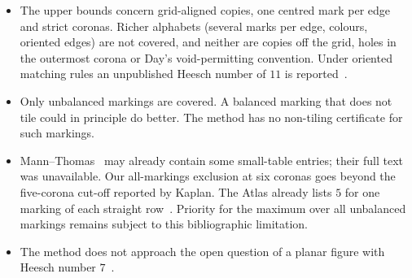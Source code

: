 \documentclass[11pt]{amsart}
\theoremstyle{definition}
\theoremstyle{remark}
\begin{document}
\begin{itemize}
\item The upper bounds concern grid-aligned copies, one centred mark per edge and strict coronas. Richer alphabets (several marks per edge, colours, oriented edges) are not covered, and neither are copies off the grid, holes in the outermost corona or Day's void-permitting convention. Under oriented matching rules an unpublished Heesch number of $11$ is reported~\cite{BDS2023}.
\item Only unbalanced markings are covered. A balanced marking that does not tile could in principle do better. The method has no non-tiling certificate for such markings.
\item Mann--Thomas~\cite{MannThomas2016} may already contain some small-table entries; their full text was unavailable. Our all-markings exclusion at six coronas goes beyond the five-corona cut-off reported by Kaplan. The Atlas already lists $5$ for one marking of each straight row~\cite{BakkerAtlas}. Priority for the maximum over all unbalanced markings remains subject to this bibliographic limitation.
\item The method does not approach the open question of a planar figure with Heesch number $7$~\cite{Kaplan2025,BakkerAtlas}.
\end{itemize}



\end{document}
